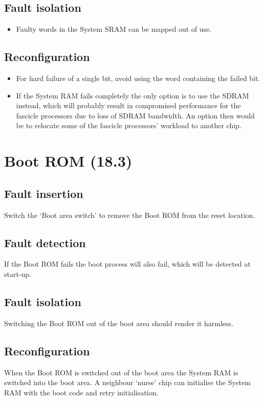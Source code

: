 \documentclass[oneside, a4paper, 11pt]{memoir}
\newenvironment{itmz}{
	\begin{itemize}
		\setlength{\itemsep}{0pt}
		\setlength{\parskip}{0pt}
	}{\end{itemize}}
\begin{document}
\subsection*{Fault isolation}
\begin{itmz}
\item Faulty words in the System SRAM can be mapped out of use.
\end{itmz}
\subsection*{Reconfiguration}
\begin{itmz}
\item For hard failure of a single bit, avoid using the word containing the failed bit.
\item If the System RAM fails completely the only option is to use the SDRAM instead, which will
probably result in compromised performance for the fascicle processors due to loss of SDRAM
bandwidth. An option then would be to relocate some of the fascicle processors' workload to
another chip.
\end{itmz}

\section{Boot ROM (18.3)}
\subsection*{Fault insertion}
Switch the `Boot area switch' to remove the Boot ROM from the reset location.
\subsection*{Fault detection}
If the Boot ROM fails the boot process will also fail, which will be detected at start-up.
\subsection*{Fault isolation}
Switching the Boot ROM out of the boot area should render it harmless.
\subsection*{Reconfiguration}
When the Boot ROM is switched out of the boot area the System RAM is switched into the boot
area. A neighbour `nurse' chip can initialise the System RAM with the boot code and retry
initialisation.
\end{document}
